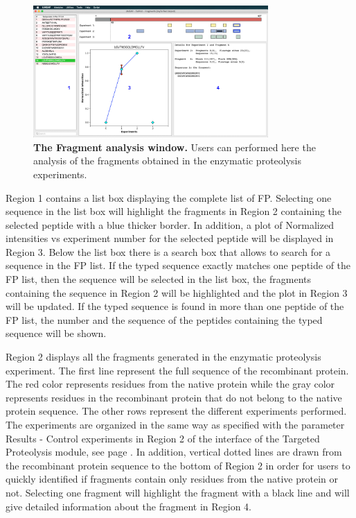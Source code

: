 \begin{figure}[h]
	\centering
	\includegraphics[width=0.8\textwidth]{./IMAGES/MOD-TARPROT/tarprot-frag.jpg}	    
	\caption[The Fragment analysis window]{\textbf{The Fragment analysis window.} Users can performed here the analysis of the fragments obtained in the enzymatic proteolysis experiments.} 
	\label{fig:enzdigfra}
	\vspace{-5pt} 	
\end{figure} 

Region \num{1} contains a list box displaying the complete list of FP. Selecting one sequence in the list box will highlight the fragments in Region \num{2} containing the selected peptide with a blue thicker border. In addition, a plot of Normalized intensities vs experiment number for the selected peptide will be displayed in Region \num{3}. Below the list box there is a search box that allows to search for a sequence in the FP list. If the typed sequence exactly matches one peptide of the FP list, then the sequence will be selected in the list box, the fragments containing the sequence in Region \num{2} will be highlighted and the plot in Region \num{3} will be updated. If the typed sequence is found in more than one peptide of the FP list, the number and the sequence of the peptides containing the typed sequence will be shown.

Region \num{2} displays all the fragments generated in the enzymatic proteolysis experiment. The first line represent the full sequence of the recombinant protein. The red color represents residues from the native protein while the gray color represents residues in the recombinant protein that do not belong to the native protein sequence. The other rows represent the different experiments performed. The experiments are organized in the same way as specified with the parameter Results - Control experiments in Region \num{2} of the interface of the Targeted Proteolysis module, see page \pageref{par:results}. In addition, vertical dotted lines are drawn from the recombinant protein sequence to the bottom of Region \num{2} in order for users to quickly identified if fragments contain only residues from the native protein or not. Selecting one fragment will highlight the fragment with a black line and will give detailed information about the fragment in Region \num{4}. 

